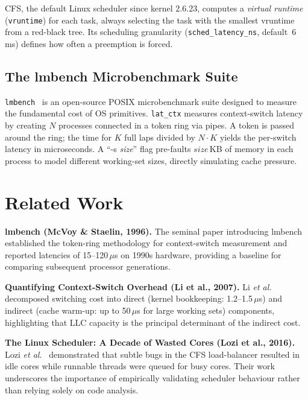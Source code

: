 \documentclass[conference]{IEEEtran}
\begin{document}
CFS, the default Linux scheduler since kernel 2.6.23, computes a
\emph{virtual runtime} (\texttt{vruntime}) for each task, always selecting the
task with the smallest vruntime from a red-black tree.  Its scheduling
granularity (\texttt{sched\_latency\_ns}, default~6\,ms) defines how often a
preemption is forced.

\subsection{The lmbench Microbenchmark Suite}
\texttt{lmbench}~\cite{mcvoy1996lmbench} is an open-source POSIX microbenchmark
suite designed to measure the fundamental cost of OS primitives.
\texttt{lat\_ctx} measures context-switch latency by creating $N$ processes
connected in a token ring via pipes.  A token is passed around the ring; the
time for $K$ full laps divided by $N \cdot K$ yields the per-switch
latency in microseconds.  A ``-s \textit{size}'' flag pre-faults
$\mathit{size}$\,KB of memory in each process to model different working-set
sizes, directly simulating cache pressure.

\section{Related Work}
\label{sec:related}

\textbf{lmbench (McVoy \& Staelin, 1996).}
The seminal paper introducing lmbench~\cite{mcvoy1996lmbench} established the
token-ring methodology for context-switch measurement and reported latencies
of 15--120\,$\mu$s on 1990s hardware, providing a baseline for comparing
subsequent processor generations.

\textbf{Quantifying Context-Switch Overhead (Li et al., 2007).}
Li \textit{et al.}~\cite{li2007quantifying} decomposed switching cost into
direct (kernel bookkeeping: 1.2--1.5\,$\mu$s) and indirect (cache warm-up:
up to 50\,$\mu$s for large working sets) components, highlighting that LLC
capacity is the principal determinant of the indirect cost.

\textbf{The Linux Scheduler: A Decade of Wasted Cores (Lozi et al., 2016).}
Lozi \textit{et al.}~\cite{lozi2016linux} demonstrated that subtle bugs in
the CFS load-balancer resulted in idle cores while runnable threads were
queued for busy cores.  Their work underscores the importance of empirically
validating scheduler behaviour rather than relying solely on code analysis.
\end{document}
